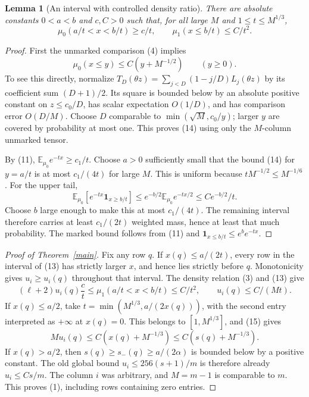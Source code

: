 \documentclass[11pt]{article}
\newtheorem{lemma}{Lemma}
\newcommand{\E}{\mathbb E}
\begin{document}
\begin{lemma}[An interval with controlled density ratio]\label{interval}
There are absolute constants $0<a<b$ and $c,C>0$ such that, for
all large $M$ and $1\le t\le M^{1/3}$,
\[
 \mu_0(a/t<x<b/t)\ge c/t,\qquad
 \mu_1(x\le b/t)\le C/t^2.                       \tag{13}
\]
\end{lemma}
\begin{proof}
First the unmarked comparison (4) implies
\[
 \mu_0(x\le y)\le C(y+M^{-1/2})\qquad(y\ge0).    \tag{14}
\]
To see this directly, normalize
$T_D(\theta z)=\sum_{j<D}(1-j/D)L_j(\theta z)$ by its coefficient
sum $(D+1)/2$. Its square is bounded below by an absolute positive
constant on $z\le c_0/D$, has scalar expectation $O(1/D)$,
and has comparison error $O(D/M)$. Choose
$D$ comparable to $\min(\sqrt M,c_0/y)$; larger $y$ are covered by
probability at most one. This proves (14) using only the $M$-column
unmarked tensor.

By (11), $\E_{\mu_0}e^{-t x}\ge c_1/t$. Choose $a>0$ sufficiently
small that the bound (14) for $y=a/t$ is at most $c_1/(4t)$ for
large $M$. This is uniform because $tM^{-1/2}\le M^{-1/6}$.
For the upper tail,
\[
 \E_{\mu_0}[e^{-t x}\boldsymbol1_{x\ge b/t}]
 \le e^{-b/2}\E_{\mu_0}e^{-t x/2}\le Ce^{-b/2}/t.
\]
Choose $b$ large enough to make this at most $c_1/(4t)$.
The remaining interval therefore carries at least $c_1/(2t)$
weighted mass, hence at least that much probability. The marked
bound follows from (11) and
$\boldsymbol1_{x\le b/t}\le e^b e^{-t x}$.
\end{proof}

\begin{proof}[Proof of Theorem~\ref{main}]
Fix any row $q$. If $x(q)\le a/(2t)$, every row in the interval
of (13) has strictly larger $x$, and hence lies strictly before $q$.
Monotonicity gives $u_i\ge u_i(q)$ throughout that interval.
The density relation (3) and (13) give
\[
 (\ell+2)u_i(q)\frac c t
 \le\mu_1(a/t<x<b/t)\le C/t^2,
 \qquad u_i(q)\le C/(Mt).                        \tag{15}
\]
If $x(q)\le a/2$, take
$t=\min(M^{1/3},a/(2x(q)))$, with the second entry interpreted as
$+\infty$ at $x(q)=0$. This belongs to $[1,M^{1/3}]$, and (15) gives
\[
 M u_i(q)\le C(x(q)+M^{-1/3})\le C(s(q)+M^{-1/3}).
\]
If $x(q)>a/2$, then $s(q)\ge s_-(q)\ge a/(2\alpha)$ is bounded
below by a positive constant. The old global bound
$u_i\le256(s+1)/m$ is therefore already $u_i\le C s/m$.
The column $i$ was arbitrary, and $M=m-1$ is comparable to $m$.
This proves (1), including rows containing zero entries.
\end{proof}
\end{document}
